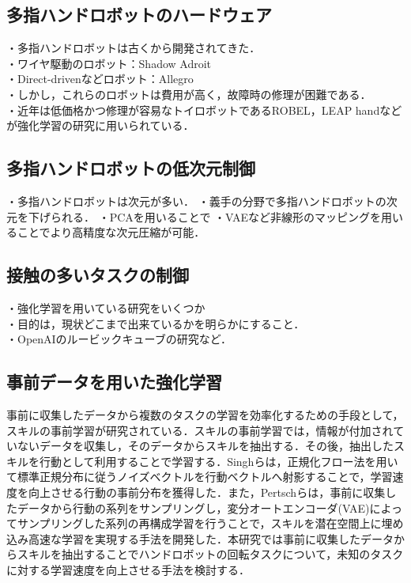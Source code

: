 \documentclass[dvipdfmx]{ampbt_nomag}
\begin{document}
\subsection{多指ハンドロボットのハードウェア}
・多指ハンドロボットは古くから開発されてきた．\\
  ・ワイヤ駆動のロボット：Shadow Adroit\cite{kumar2014real}\\
  ・Direct-drivenなどロボット：Allegro\\
・しかし，これらのロボットは費用が高く，故障時の修理が困難である．\\
・近年は低価格かつ修理が容易なトイロボットであるROBEL\cite{ahn2020robel}，LEAP hand\cite{shaw2023leap}などが強化学習の研究に用いられている．\\

\subsection{多指ハンドロボットの低次元制御}
・多指ハンドロボットは次元が多い．
・義手の分野で多指ハンドロボットの次元を下げられる．
・PCAを用いることで
・VAEなど非線形のマッピングを用いることでより高精度な次元圧縮が可能．


\subsection{接触の多いタスクの制御}
・強化学習を用いている研究をいくつか\\
・目的は，現状どこまで出来ているかを明らかにすること．\\
・OpenAIのルービックキューブの研究など．\\

\subsection{事前データを用いた強化学習}
事前に収集したデータから複数のタスクの学習を効率化するための手段として，スキルの事前学習が研究されている．スキルの事前学習では，情報が付加されていないデータを収集し，そのデータからスキルを抽出する．その後，抽出したスキルを行動として利用することで学習する．Singhらは，正規化フロー法\cite{dinh2016density}を用いて標準正規分布に従うノイズベクトルを行動ベクトルへ射影することで，学習速度を向上させる行動の事前分布を獲得した\cite{singh2020parrot}．また，Pertschらは，事前に収集したデータから行動の系列をサンプリングし，変分オートエンコーダ(VAE)によってサンプリングした系列の再構成学習を行うことで，スキルを潜在空間上に埋め込み高速な学習を実現する手法を開発した\cite{pertsch2021accelerating}．本研究では事前に収集したデータからスキルを抽出することでハンドロボットの回転タスクについて，未知のタスクに対する学習速度を向上させる手法を検討する．
\end{document}
